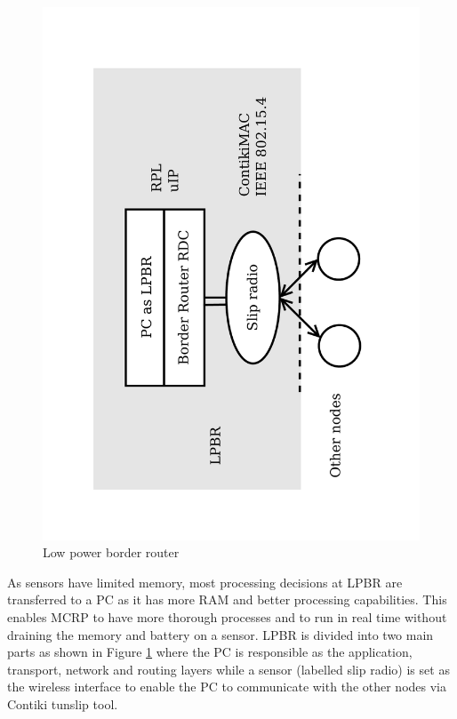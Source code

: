 \begin{figure}
\centering
\includegraphics[trim=2cm 2cm 3cm 2cm, clip=true, totalheight=0.45\textheight, angle=270]{BR2.pdf}
\caption{Low power border router}
\label{fig_lpbr}
\end{figure}

As sensors have limited memory, most processing decisions at LPBR are transferred to a PC as it has more RAM and better processing capabilities. This enables MCRP to have more thorough processes and to run in real time without draining the memory and battery on a sensor. LPBR is divided into two main parts as shown in Figure \ref{fig_lpbr} where the PC is responsible as the application, transport, network and routing layers while a sensor (labelled slip radio) is set as the wireless interface to enable the PC to communicate with the other nodes via Contiki tunslip tool. 

